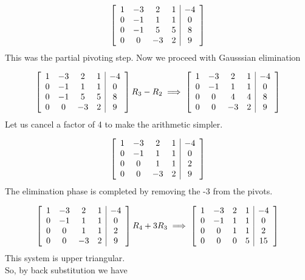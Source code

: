 \documentclass[a4paper, 12pt]{report}
\begin{document}
{     \[
     \left[ \begin{array}{c c c c| c}
     1& -3& 2& 1& -4\\
     0& -1& 1& 1& 0\\
     0& -1& 5& 5& 8\\
     0& 0& -3& 2& 9
     \end{array} \right]
     \]
     This was the partial pivoting step. Now we proceed with Gausssian elimination
     
     \[
     \left[ \begin{array}{c c c c| c}
     1& -3& 2& 1& -4\\
     0& -1& 1& 1& 0\\
     0& -1& 5& 5& 8\\
     0& 0& -3& 2& 9
     \end{array} \right]
     R_3-R_2 \implies
     \left[ \begin{array}{c c c c| c}
     1& -3& 2& 1& -4\\
     0& -1& 1& 1& 0\\
     0& 0& 4& 4& 8\\
     0& 0& -3& 2& 9
     \end{array} \right]
     \]
     Let us cancel a factor of 4 to make the arithmetic simpler.
     
     \[
     \left[ \begin{array}{c c c c| c}
     1& -3& 2& 1& -4\\
     0& -1& 1& 1& 0\\
     0& 0& 1& 1& 2\\
     0& 0& -3& 2& 9
     \end{array} \right]
     \]
     The elimination phase is completed by removing the -3 from the pivots.
     
     \[
     \left[ \begin{array}{c c c c| c}
     1& -3& 2& 1& -4\\
     0& -1& 1& 1& 0\\
     0& 0& 1& 1& 2\\
     0& 0& -3& 2& 9
     \end{array} \right]
     R_4+3R_3 \implies
     \left[ \begin{array}{c c c c| c}
     1& -3& 2& 1& -4\\
     0& -1& 1& 1& 0\\
     0& 0& 1& 1& 2\\
     0& 0& 0& 5& 15
     \end{array} \right]
     \]
     This system is upper triangular.\\
     So, by back substitution we have
     
}
\end{document}
